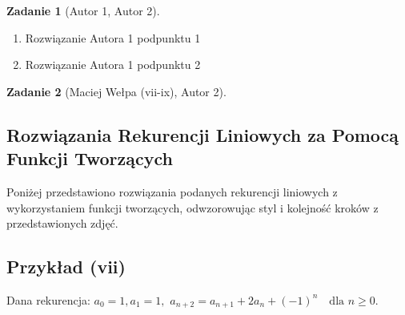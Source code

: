 \documentclass{mwart}
\newtheorem{zad}{Zadanie}[section]
\begin{document}
\begin{zad}[Autor 1, Autor 2]
\end{zad}
\begin{mdframed}
    \begin{enumerate}
        \item Rozwiązanie Autora 1 podpunktu 1
        \item Rozwiązanie Autora 1 podpunktu 2
    \end{enumerate}
\end{mdframed}

\begin{zad}[Maciej Wełpa (vii-ix), Autor 2]
\end{zad}
\begin{mdframed}

    \section*{Rozwiązania Rekurencji Liniowych za Pomocą Funkcji Tworzących}

    Poniżej przedstawiono rozwiązania podanych rekurencji liniowych z wykorzystaniem funkcji tworzących, odwzorowując styl i kolejność kroków z przedstawionych zdjęć.
    
    \subsection*{Przykład (vii)}
    Dana rekurencja:
    $a_0 = 1, a_1 = 1,$
    $a_{n+2} = a_{n+1} + 2a_n + (-1)^n \quad \text{dla } n \ge 0.$
    

\end{mdframed}
\end{document}
